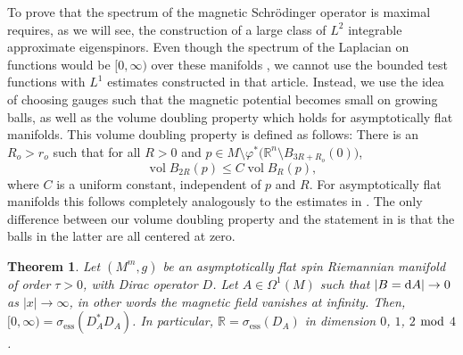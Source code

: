 \documentclass[pdftex]{sigma}
\numberwithin{equation}{section}
\newtheorem{Theorem}{Theorem}[section]
\begin{document}
To prove that the spectrum of the magnetic Schr\"odinger operator is maximal requires, as we will see, the construction of a large class of $L^2$ integrable approximate eigenspinors. Even though the spectrum of the Laplacian on functions would be $[0,\infty)$ over these manifolds \cite{ChLu2}, we cannot use the bounded test functions with $L^1$ estimates constructed in that article. Instead, we use the idea of \cite{CFKS} choosing gauges such that the magnetic potential becomes small on growing balls, as well as the volume doubling property which holds for asymptotically flat manifolds.
This volume doubling property is defined as follows: There is an $R_o>r_o$ such that for all $R>0$ and $p\in M\setminus \varphi^*\bigl({\mathbb R}^n\setminus B_{3R+R_o}(0)\bigr)$,
\begin{equation} \label{VD}
\operatorname{vol}  B_{2R}(p)\leq C \operatorname{vol}  B_{R}(p),
\end{equation}
where $C$ is a uniform constant, independent of $p$ and $R$. For asymptotically flat manifolds this follows completely analogously to the estimates in \cite[Proof of Proposition~1]{Paeng}. The only difference between our volume doubling property and the statement in \cite{Paeng} is that the balls in the latter are all centered at zero.

\begin{Theorem}\label{thm_mag_zero}
Let $(M^m,g)$ be an asymptotically flat spin Riemannian manifold of order $\tau>0$, with Dirac operator $D$. Let $A\in \Omega^1(M)$ such that $|B={\rm d}A|\to 0$ as $|x|\to \infty$, in other words the magnetic field vanishes at infinity. 	
Then, $[0,\infty) = \sigma_{\mathrm{ess}} (D_A^*D_A)$. In particular, ${\mathbb R} = \sigma_{\mathrm{ess}} (D_A)$ in dimension $0$, $1$, $2$ $\rm {mod}$ $4$.
\end{Theorem}
\end{document}
